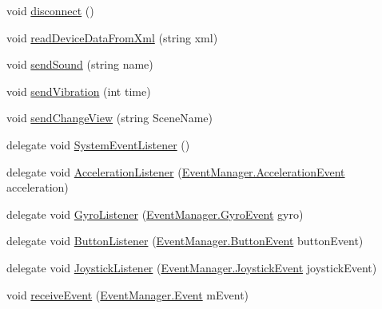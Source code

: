\begin{DoxyCompactItemize}
\item 
void \hyperlink{class_game_controller_a47e7610a9cddf869968b388926eab62a}{disconnect} ()
\item 
void \hyperlink{class_game_controller_a186282de3ec7fb68cde00368cbfd697d}{read\+Device\+Data\+From\+Xml} (string xml)
\item 
void \hyperlink{class_game_controller_aadac19b966dfc27827a6f68ea15d9cec}{send\+Sound} (string name)
\item 
void \hyperlink{class_game_controller_a662e97a1d293708aade81c6e2afd0a22}{send\+Vibration} (int time)
\item 
void \hyperlink{class_game_controller_a8d4cf54c02ecd7cff7dd3995116efac5}{send\+Change\+View} (string Scene\+Name)
\item 
delegate void \hyperlink{class_game_controller_a6c79406c908b41c4f4520c6789d829e6}{System\+Event\+Listener} ()
\item 
delegate void \hyperlink{class_game_controller_a87b7db4c19ae1dd2ecbf94c6f1be5c90}{Acceleration\+Listener} (\hyperlink{class_event_manager_1_1_acceleration_event}{Event\+Manager.\+Acceleration\+Event} acceleration)
\item 
delegate void \hyperlink{class_game_controller_a5e0106b2e58b70c011fe7f7e9f58ecce}{Gyro\+Listener} (\hyperlink{class_event_manager_1_1_gyro_event}{Event\+Manager.\+Gyro\+Event} gyro)
\item 
delegate void \hyperlink{class_game_controller_a0d4534f57395c87d869dc90a70419e7f}{Button\+Listener} (\hyperlink{class_event_manager_1_1_button_event}{Event\+Manager.\+Button\+Event} button\+Event)
\item 
delegate void \hyperlink{class_game_controller_a653ceafbd20d279abc65adf386a358aa}{Joystick\+Listener} (\hyperlink{class_event_manager_1_1_joystick_event}{Event\+Manager.\+Joystick\+Event} joystick\+Event)
\item 
void \hyperlink{class_game_controller_a5b9e4d1735ec8d689a35ad187aefe1e9}{receive\+Event} (\hyperlink{class_event_manager_1_1_event}{Event\+Manager.\+Event} m\+Event)
\end{DoxyCompactItemize}
